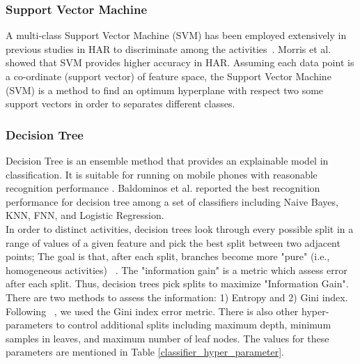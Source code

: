 \documentclass[journal,article,submit,moreauthors,pdftex]{Definitions/mdpi}
\begin{document}
\subsubsection{Support Vector Machine}
A multi-class Support Vector Machine (SVM) has been employed extensively in previous studies in HAR to discriminate among the activities~\cite{zhang2012physical,rosati2018comparison,morris2014recofit}. Morris et al.~\cite{morris2014recofit} showed that SVM provides higher accuracy in HAR. Assuming each data point is a co-ordinate (support vector) of feature space, the Support Vector Machine (SVM) is a method to find an optimum hyperplane with respect two some support vectors in order to separates different classes. 



\subsubsection{Decision Tree}

Decision Tree is an ensemble method that provides an explainable model in classification. It is suitable for running on mobile phones with reasonable recognition performance \cite{mortazavi2014determining, baldominos2019comparison, shoaib2016complex}. Baldominos et al. \cite{baldominos2019comparison} reported the best recognition performance for decision tree among a set of classifiers including Naive Bayes, KNN, FNN, and Logistic Regression.\\
In order to distinct activities, decision trees look through every possible split in a range of values of a given feature and pick the best split between two adjacent points; The goal is that, after each split, branches become more "pure" (i.e., homogeneous activities) ~\cite{bishop2006pattern}. The "information gain" is a metric which assess error after each split. Thus, decision trees pick splits to maximize "Information Gain". There are two methods to assess the information: 1) Entropy and 2) Gini index.\\
Following ~\cite{rosati2018comparison, masum2018human}, we used the Gini index error metric.
There is also other hyper-parameters to control additional splits including maximum depth, minimum samples in leaves, and maximum number of leaf nodes. The values for these parameters are mentioned in Table \ref{classifier_hyper_parameter}. 
\end{document}
